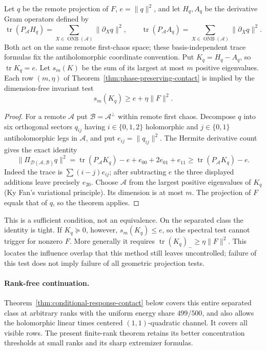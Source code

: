 \begin{corollary}
\label{cor:phase-contact-spectral}
Let $q$ be the remote projection of $F$, $e=\|q\|^2$, and let
$H_q,A_q$ be the derivative Gram operators defined by
\[
 \operatorname{tr}(P_{\mathcal A}H_q)
 =\sum_{X\in\operatorname{ONB}(\mathcal A)}\|\partial_Xq\|^2,
 \qquad
 \operatorname{tr}(P_{\mathcal A}A_q)
 =\sum_{X\in\operatorname{ONB}(\mathcal A)}\|\partial_{\bar X}q\|^2.
\]
Both act on the same remote first-chaos space; these basis-independent
trace formulas fix the antiholomorphic coordinate convention.
Put $K_q=H_q-A_q$, so $\operatorname{tr}K_q=e$.
Let $s_m(K)$ be the sum of its largest at most $m$ positive eigenvalues.
Each row $(m,\eta)$ of Theorem~\ref{thm:phase-preserving-contact} is
implied by the dimension-free invariant test
\[
 \boxed{s_m(K_q)\ge e+\eta\|F\|^2.}
\]
\end{corollary}
\begin{proof}
For a remote $\mathcal A$ put $\mathcal B=\mathcal A^\perp$ within
remote first chaos. Decompose $q$ into six orthogonal sectors
$q_{ij}$ having $i\in\{0,1,2\}$ holomorphic and $j\in\{0,1\}$
antiholomorphic legs in $\mathcal A$, and put $e_{ij}=\|q_{ij}\|^2$.
The Hermite derivative count gives the exact identity
\[
 \|\Pi_{\mathcal D(\mathcal A,\mathcal B)}q\|^2
 =\operatorname{tr}(P_{\mathcal A}K_q)-e
      +e_{00}+2e_{01}+e_{11}
 \ge\operatorname{tr}(P_{\mathcal A}K_q)-e.
\]
Indeed the trace is $\sum(i-j)e_{ij}$; after subtracting $e$ the
three displayed additions leave precisely $e_{20}$.
Choose $\mathcal A$ from the largest positive eigenvalues of $K_q$
(Ky Fan's variational principle). Its dimension is at most $m$.
The projection of $F$ equals that of $q$, so the theorem applies.
\end{proof}
This is a sufficient condition, not an equivalence. On the separated
class the identity is tight. If $K_q\succeq0$, however,
$s_m(K_q)\le e$, so the spectral test cannot trigger for nonzero $F$.
More generally it requires
$\operatorname{tr}(K_q)_-\ge\eta\|F\|^2$.
This locates the influence overlap that this method still leaves
uncontrolled; failure of this test does not imply failure of all
geometric projection tests.

\paragraph{Rank-free continuation.}
Theorem~\ref{thm:conditional-response-contact} below covers this entire
separated class at arbitrary ranks with the uniform energy share
$499/500$, and also allows the holomorphic linear times centered
$(1,1)$-quadratic channel. It covers all visible rows. The present
finite-rank theorem retains its better concentration thresholds at
small ranks and its sharp extremizer formulas.

